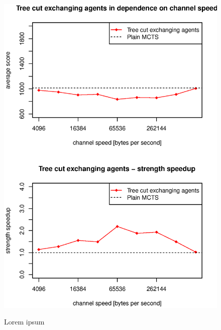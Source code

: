 \begin{figure}
\begin{center}
\includegraphics{img/tree-cut-channel-speed.eps}
\end{center}
\caption{\footnotesize Lorem ipsum}{\footnotesize }
\label{fig_tree_cut_channel_speed}
\end{figure}

